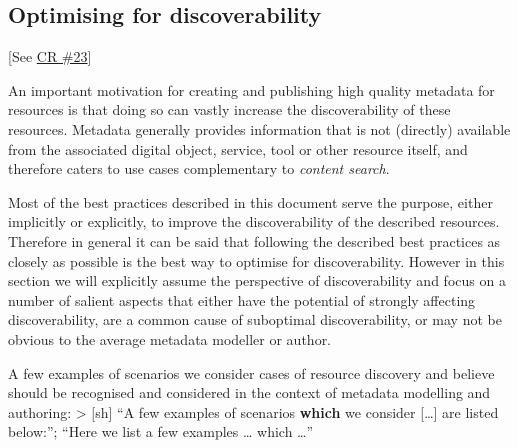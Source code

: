 \documentclass[]{article}
\date{}
\begin{document}
\subsection{Optimising for
discoverability}\label{optimising-for-discoverability}

{[}See
\href{https://www.gitbook.com/book/cmdi-taskforce/cmdi-best-practices/changes/23}{CR
\#23}{]}

An important motivation for creating and publishing high quality
metadata for resources is that doing so can vastly increase the
discoverability of these resources. Metadata generally provides
information that is not (directly) available from the associated digital
object, service, tool or other resource itself, and therefore caters to
use cases complementary to \emph{content search}.

Most of the best practices described in this document serve the purpose,
either implicitly or explicitly, to improve the discoverability of the
described resources. Therefore in general it can be said that following
the described best practices as closely as possible is the best way to
optimise for discoverability. However in this section we will explicitly
assume the perspective of discoverability and focus on a number of
salient aspects that either have the potential of strongly affecting
discoverability, are a common cause of suboptimal discoverability, or
may not be obvious to the average metadata modeller or author.

A few examples of scenarios we consider cases of resource discovery and
believe should be recognised and considered in the context of metadata
modelling and authoring: \textgreater{} {[}sh{]} ``A few examples of
scenarios \textbf{which} we consider {[}\ldots{}{]} are listed below:'';
``Here we list a few examples \ldots{} which \ldots{}''
\end{document}
